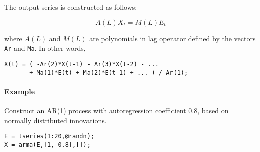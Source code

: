 The output series is constructed as follows:

\[ A(L) X_t = M(L) E_t \]

where $A(L)$ and $M(L)$ are polynomials in lag operator defined by the
vectors \texttt{Ar} and \texttt{Ma}. In other words,

\begin{verbatim}
X(t) = ( -Ar(2)*X(t-1) - Ar(3)*X(t-2) - ...
       + Ma(1)*E(t) + Ma(2)*E(t-1) + ... ) / Ar(1);
\end{verbatim}

\paragraph{Example}

Construct an AR(1) process with autoregression coefficient 0.8, based on
normally distributed innovations.

\begin{verbatim}
E = tseries(1:20,@randn);
X = arma(E,[1,-0.8],[]);
\end{verbatim}


